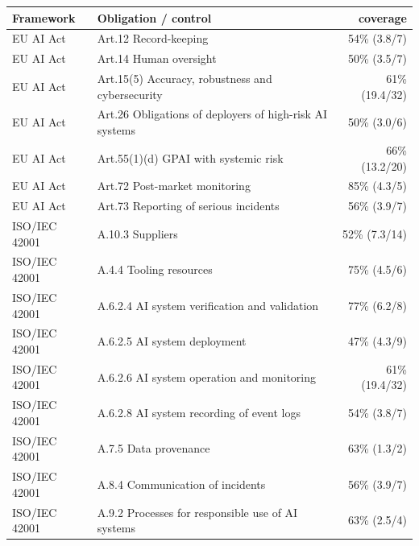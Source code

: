 \begin{tabular}{@{}llr@{}}
\toprule
Framework & Obligation / control & \proxy{} coverage \\
\midrule
EU AI Act & Art.12 Record-keeping & 54\% (3.8/7) \\
EU AI Act & Art.14 Human oversight & 50\% (3.5/7) \\
EU AI Act & Art.15(5) Accuracy, robustness and cybersecurity & 61\% (19.4/32) \\
EU AI Act & Art.26 Obligations of deployers of high-risk AI systems & 50\% (3.0/6) \\
EU AI Act & Art.55(1)(d) GPAI with systemic risk & 66\% (13.2/20) \\
EU AI Act & Art.72 Post-market monitoring & 85\% (4.3/5) \\
EU AI Act & Art.73 Reporting of serious incidents & 56\% (3.9/7) \\
\midrule
ISO/IEC 42001 & A.10.3 Suppliers & 52\% (7.3/14) \\
ISO/IEC 42001 & A.4.4 Tooling resources & 75\% (4.5/6) \\
ISO/IEC 42001 & A.6.2.4 AI system verification and validation & 77\% (6.2/8) \\
ISO/IEC 42001 & A.6.2.5 AI system deployment & 47\% (4.3/9) \\
ISO/IEC 42001 & A.6.2.6 AI system operation and monitoring & 61\% (19.4/32) \\
ISO/IEC 42001 & A.6.2.8 AI system recording of event logs & 54\% (3.8/7) \\
ISO/IEC 42001 & A.7.5 Data provenance & 63\% (1.3/2) \\
ISO/IEC 42001 & A.8.4 Communication of incidents & 56\% (3.9/7) \\
ISO/IEC 42001 & A.9.2 Processes for responsible use of AI systems & 63\% (2.5/4) \\
\bottomrule
\end{tabular}
